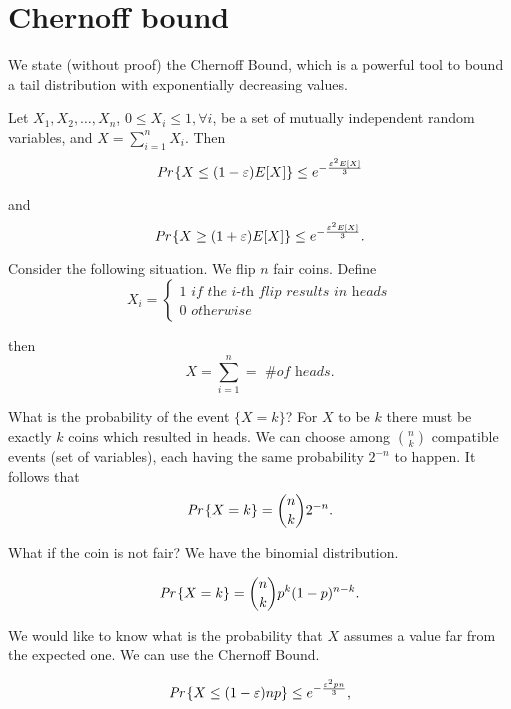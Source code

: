 \section{Chernoff bound}

We state (without proof) the Chernoff Bound, which is a powerful tool to bound a tail distribution with exponentially decreasing values.
\begin{thm}
	Let $X_1, X_2, \ldots, X_n$, $0 \leq X_i \leq 1,\forall i$, be a set of mutually independent random variables, and $X = \sum_{i=1}^nX_i$. Then
	\begin{equation}
	\emph{Pr}\left\{X \leq (1-\varepsilon)E[X]\right\} \leq e^{-\frac{\varepsilon^2E[X]}{3}}
	\end{equation}
	
	and
	\begin{equation}
	\emph{Pr}\left\{X \geq (1+\varepsilon)E[X]\right\} \leq e^{-\frac{\varepsilon^2E[X]}{3}}.
	\end{equation}
\end{thm}

Consider the following situation. We flip $n$ fair coins. Define
\[X_i = \begin{cases}1 \textit{ if the i-th flip results in heads}\\0 \textit{ otherwise}\end{cases}\]

then 
\[X = \sum_{i=1}^n = \textit{ \# of heads}.\] 

What is the probability of the event $\{X = k\}$? For $X$ to be $k$ there must be exactly $k$ coins which resulted in heads. We can choose among $\binom{n}{k}$ compatible events (set of variables), each having the same probability $2^{-n}$ to happen. It follows that
\begin{equation*}
	\emph{Pr}\left\{X = k\right\} = \binom{n}{k}2^{-n}.
\end{equation*} 

What if the coin is not fair? We have the binomial distribution.

\begin{equation}
	\emph{Pr}\left\{X = k\right\} = \binom{n}{k} p^k(1-p)^{n-k}.
\end{equation}

We would like to know what is the probability that $X$ assumes a value far from the expected one. We can use the Chernoff Bound.

\begin{equation}
	\emph{Pr}\left\{X \leq (1-\varepsilon)np\right\} \leq e^{-\frac{\varepsilon^2pn}{3}},
\end{equation}

